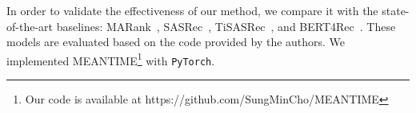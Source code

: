 In order to validate the effectiveness of our method, we compare it with the state-of-the-art baselines: MARank~\cite{MARANK}, SASRec~\cite{SASRec}, TiSASRec~\cite{TISASRec}, and BERT4Rec~\cite{BERT4Rec}. These models are evaluated based on the code provided by the authors.
We implemented MEANTIME\footnote{Our code is available at https://github.com/SungMinCho/MEANTIME} with \verb|PyTorch|.
